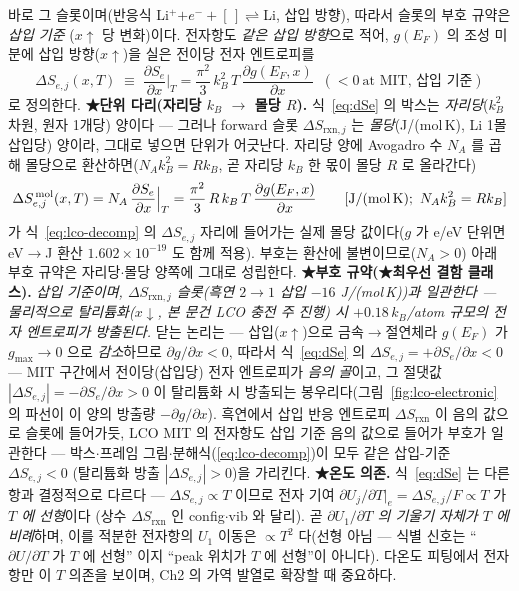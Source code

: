 \documentclass[11pt,a4paper]{article}
\newcommand{\rxn}{\mathrm{rxn}}
\begin{document}
바로 그 슬롯이며(반응식 Li$^+$$+e^-+[\,]\rightleftharpoons$Li, 삽입 방향), 따라서 슬롯의 부호 규약은 \emph{삽입 기준}
($x\!\uparrow$ 당 변화)이다. 전자항도 \emph{같은 삽입 방향}으로 적어, $g(E_F)$ 의 조성 미분에 삽입 방향($x\!\uparrow$)을
실은 전이당 전자 엔트로피를
\begin{equation}
\boxed{\;\Delta S_{e,j}(x,T)\;\equiv\;\frac{\partial S_e}{\partial x}\Big|_T
=\frac{\pi^2}{3}\,k_B^2\,T\,\frac{\partial g(E_F,x)}{\partial x}\;\;(<0\ \text{at MIT, 삽입 기준})\;}
\label{eq:dSe}
\end{equation}
로 정의한다. \textbf{★단위 다리(자리당 $k_B$ $\to$ 몰당 $R$).} 식~\eqref{eq:dSe} 의 박스는 \emph{자리당}($k_B^2$ 차원,
원자 1개당) 양이다 — 그러나 forward 슬롯 $\Delta S_{\rxn,j}$ 는 \emph{몰당}(J/(mol\,K), Li 1몰 삽입당) 양이라, 그대로
넣으면 단위가 어긋난다. 자리당 양에 Avogadro 수 $N_A$ 를 곱해 몰당으로 환산하면($N_A k_B^2=R k_B$, 곧 자리당 $k_B$ 한 몫이
몰당 $R$ 로 올라간다)
\begin{equation}
\Delta S_{e,j}^{\,\mathrm{mol}}(x,T)=N_A\,\frac{\partial S_e}{\partial x}\Big|_T
=\frac{\pi^2}{3}\,R\,k_B\,T\,\frac{\partial g(E_F,x)}{\partial x}
\qquad[\text{J/(mol\,K)};\ N_A k_B^2=R k_B]
\label{eq:dSemolar}
\end{equation}
가 식~\eqref{eq:lco-decomp} 의 $\Delta S_{e,j}$ 자리에 들어가는 실제 몰당 값이다($g$ 가 e/eV 단위면 eV$\to$J 환산
$1.602\times10^{-19}$ 도 함께 적용). 부호는 환산에 불변이므로($N_A>0$) 아래 부호 규약은 자리당$\cdot$몰당 양쪽에 그대로
성립한다. \textbf{★부호 규약(★최우선 결함 클래스).} \emph{삽입 기준이며, $\Delta S_{\rxn,j}$ 슬롯(흑연 $2\!\to\!1$
삽입 $-16$ J/(mol\,K))과 일관한다 — 물리적으로 탈리튬화($x\!\downarrow$, 본 문건 LCO 충전 주 진행) 시 $+0.18\,k_B$/atom
규모의 전자 엔트로피가 방출된다.} 닫는 논리는 — 삽입($x\!\uparrow$)으로 금속$\to$절연체라 $g(E_F)$ 가 $g_{\max}\!\to\!0$
으로 \emph{감소}하므로 $\partial g/\partial x<0$, 따라서 식~\eqref{eq:dSe} 의 $\Delta S_{e,j}=+\partial S_e/\partial x<0$
— MIT 구간에서 전이당(삽입당) 전자 엔트로피가 \emph{음의 골}이고, 그 절댓값 $|\Delta S_{e,j}|=-\partial S_e/\partial x>0$
이 탈리튬화 시 방출되는 봉우리다(그림~\ref{fig:lco-electronic} 의 파선이 이 양의 방출량 $-\partial g/\partial x$). 흑연에서
삽입 반응 엔트로피 $\Delta S_\rxn$ 이 음의 값으로 슬롯에 들어가듯, LCO MIT 의 전자항도 삽입 기준 음의 값으로 들어가
부호가 일관한다 — 박스$\cdot$프레임 그림$\cdot$분해식(\eqref{eq:lco-decomp})이 모두 같은 삽입-기준 $\Delta S_{e,j}<0$
(탈리튬화 방출 $|\Delta S_{e,j}|>0$)을 가리킨다. \textbf{★온도 의존.} 식~\eqref{eq:dSe} 는 다른 항과 결정적으로 다르다 —
$\Delta S_{e,j}\propto T$ 이므로 전자 기여 $\partial U_j/\partial T|_e=\Delta S_{e,j}/F\propto T$ 가 \emph{$T$ 에 선형}이다
(상수 $\Delta S_\rxn$ 인 config$\cdot$vib 와 달리). 곧 \emph{$\partial U_1/\partial T$ 의 기울기 자체가 $T$ 에 비례}하며,
이를 적분한 전자항의 $U_1$ 이동은 $\propto T^2$ 다(선형 아님 — 식별 신호는 ``$\partial U/\partial T$ 가 $T$ 에 선형''
이지 ``peak 위치가 $T$ 에 선형''이 아니다). 다온도 피팅에서 전자항만 이 $T$ 의존을 보이며, Ch2 의 가역 발열로 확장할
때 중요하다.
\end{document}

